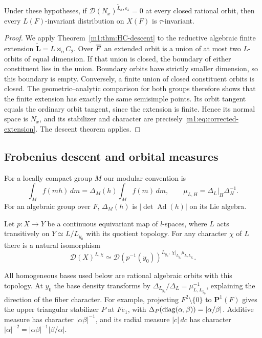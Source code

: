 \begin{corollary}\label{m1:cor:HC-invariance}
Under these hypotheses, if
$\mathcal D(N_x)^{\widetilde L_x,\varepsilon_x}=0$ at every closed rational
orbit, then every $L(F)$-invariant distribution on $X(F)$ is
$\tau$-invariant.
\end{corollary}
\begin{proof}
We apply Theorem~\ref{m1:thm:HC-descent} to the reductive algebraic finite
extension $\mathbf{\widetilde L}=L\rtimes_\alpha C_2$. Over $\overline F$ an
extended orbit is a union of at most two $L$-orbits of equal dimension.
If that union is closed, the boundary of either constituent lies in the
union. Boundary orbits have strictly smaller dimension, so this boundary
is empty. Conversely, a finite union of closed constituent orbits is
closed. The geometric--analytic comparison for both groups therefore
shows that the finite extension has exactly the same semisimple points.
Its orbit tangent equals the ordinary orbit tangent, since the extension
is finite. Hence its normal space is $N_x$, and its stabilizer and character
are precisely \eqref{m1:eq:corrected-extension}. The descent theorem applies.
\end{proof}

\subsection{Frobenius descent and orbital measures}\label{m1:subsec:Frobenius}
For a locally compact group $M$ our modular convention is
\begin{equation}\label{m1:eq:modulus}
 \int_M f(mh)\,dm=\Delta_M(h)\int_M f(m)\,dm,
 \qquad \mu_{L,H}=\Delta_L|_H\Delta_H^{-1}.
\end{equation}
For an algebraic group over $F$, $\Delta_M(h)$ is
$|\det\operatorname{Ad}(h)|$ on its Lie algebra.

\begin{proposition}
\label{m1:prop:Frobenius-descent}\label{m2:tools:frobenius}
Let $p:X\to Y$ be a continuous equivariant map of $l$-spaces, where $L$
acts transitively on $Y\simeq L/L_{y_0}$ with its quotient topology. For
any character $\chi$ of $L$ there is a natural isomorphism
\begin{equation}\label{m2:tools:frobformula}
 \mathcal D(X)^{L,\chi}\simeq
 \mathcal D(p^{-1}(y_0))^{L_{y_0},\,\chi|_{L_{y_0}}\mu_{L,L_{y_0}}}.
\end{equation}
\end{proposition}
All homogeneous bases used below are rational algebraic orbits with this
topology. At $y_0$ the base density transforms by
$\Delta_{L_{y_0}}/\Delta_L=\mu_{L,L_{y_0}}^{-1}$, explaining the direction
of the fiber character. For example, projecting $F^2\setminus\{0\}$ to
$\mathbf P^1(F)$ gives the upper triangular stabilizer $P$ at $Fe_1$,
with $\Delta_P(\operatorname{diag}(\alpha,\beta))=|\alpha/\beta|$. Additive measure has
character $|\alpha\beta|^{-1}$, and its radial measure $|c|\,dc$ has
character $|\alpha|^{-2}=|\alpha\beta|^{-1}|\beta/\alpha|$.

